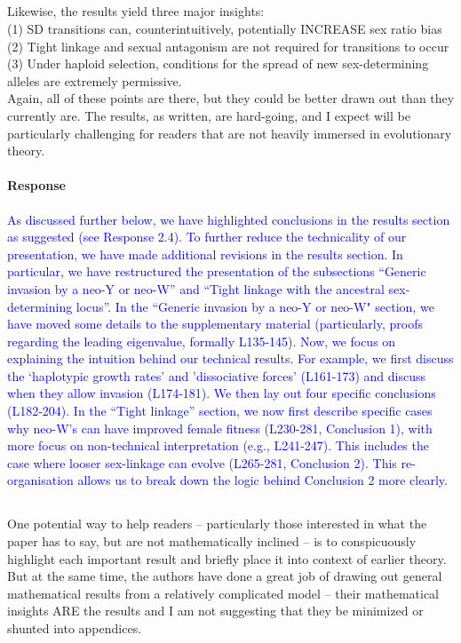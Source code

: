 \documentclass[10pt,letterpaper]{article}
\begin{document}
\noindent\subsection{}
Likewise, the results yield three major insights:\\
(1) SD transitions can, counterintuitively, potentially INCREASE sex ratio bias\\
(2) Tight linkage and sexual antagonism are not required for transitions to occur\\
(3) Under haploid selection, conditions for the spread of new sex-determining alleles are extremely permissive.\\
Again, all of these points are there, but they could be better drawn out than they currently are. The results, as written, are hard-going, and I expect will be particularly challenging for readers that are not heavily immersed in evolutionary theory.

\noindent\paragraph{Response}
\textcolor{blue}{
As discussed further below, we have highlighted conclusions in the results section as suggested (see Response 2.4). 
To further reduce the technicality of our presentation, we have made additional revisions in the results section. 
In particular, we have restructured the presentation of the subsections ``Generic invasion by a neo-Y or neo-W'' and ``Tight linkage with the ancestral sex-determining locus''. 
In the ``Generic invasion by a neo-Y or neo-W" section, we have moved some details to the supplementary material (particularly, proofs regarding the leading eigenvalue, formally L135-145). 
Now, we focus on explaining the intuition behind our technical results.  
For example, we first discuss the `haplotypic growth rates' and 'dissociative forces' (L161-173) and discuss when they allow invasion (L174-181).
We then lay out four specific conclusions (L182-204). 
In the ``Tight linkage'' section, we now first describe specific cases why neo-W's can have improved female fitness (L230-281, Conclusion 1), with more focus on non-technical interpretation (e.g., L241-247). 
This includes the case where looser sex-linkage can evolve (L265-281, Conclusion 2). 
This re-organisation allows us to break down the logic behind Conclusion 2 more clearly. 
}

\noindent\subsection{}
One potential way to help readers -- particularly those interested in what the paper has to say, but are not mathematically inclined -- is to conspicuously highlight each important result and briefly place it into context of earlier theory. But at the same time, the authors have done a great job of drawing out general mathematical results from a relatively complicated model -- their mathematical insights ARE the results and I am not suggesting that they be minimized or shunted into appendices.
\end{document}
